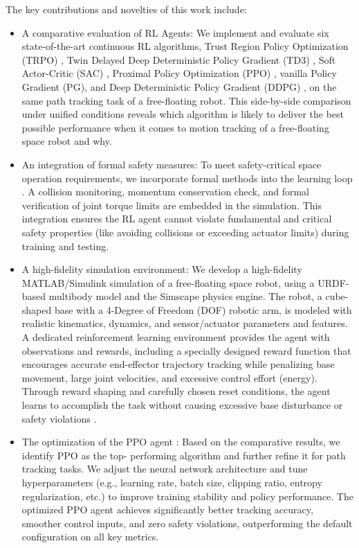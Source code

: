 \documentclass{ieeeaccess}
\begin{document}
The key 
contributions and novelties of this work include:



\begin{itemize}
  \item A comparative evaluation of RL Agents: We implement and evaluate six state-of-the-art
continuous RL algorithms, Trust Region Policy Optimization (TRPO) \cite{b14}, Twin Delayed Deep
Deterministic Policy Gradient (TD3) \cite{b17}, Soft Actor-Critic (SAC) \cite{b18}, Proximal Policy Optimization
(PPO) \cite{b15}, vanilla Policy Gradient (PG)\cite{b21}, and Deep Deterministic Policy Gradient (DDPG) \cite{b7}, on the same path tracking task of a free-floating robot. 
This side-by-side comparison under unified
conditions reveals which algorithm is likely to deliver the best possible performance when it comes to motion tracking of a free-floating space robot and
why.
  \item An integration of formal safety measures: To meet safety-critical space operation requirements,
we incorporate formal methods into the learning loop \cite{b5, b6, b22, b23}. A collision monitoring, momentum
conservation check, and formal verification of joint torque limits are embedded in the simulation. This integration 
ensures the RL agent cannot violate fundamental and critical safety properties (like avoiding collisions or exceeding actuator limits) during training and testing.
 \item A high-fidelity simulation environment: We develop a high-fidelity MATLAB/Simulink simulation
of a free-floating space robot, using a URDF-based multibody model and the Simscape physics engine. The robot, a 
cube-shaped base with a 4-Degree of Freedom (DOF) robotic arm, is modeled with realistic kinematics, dynamics, and sensor/actuator 
parameters and features. A dedicated reinforcement learning environment provides the agent with observations and rewards, including 
a specially designed reward function that encourages accurate end-effector trajectory tracking while penalizing base movement, 
large joint velocities, and excessive control effort (energy).
Through reward shaping and carefully chosen reset conditions, the agent learns to accomplish the task without causing 
excessive base disturbance or safety violations \cite{b25,b26,b27,b28,b7}.
 \item The optimization of the PPO agent : Based on the comparative results, we identify PPO as the top-
performing algorithm and further refine it for path tracking tasks. We adjust the neural network
architecture and tune hyperparameters (e.g., learning rate, batch size, clipping ratio, entropy
regularization, etc.) to improve training stability and policy performance. The optimized
PPO agent achieves significantly better tracking accuracy, smoother control inputs, and zero
safety violations, outperforming the default configuration on all key metrics.
\end{itemize}
\end{document}
